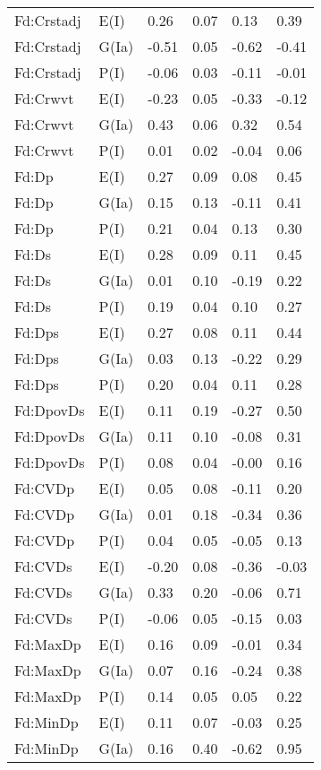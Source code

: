 \begin{center}
\begin{longtable}{|p{1.1in}|p{0.7in}|p{0.7in}|p{0.6in}|p{0.6in}|p{0.6in}|}
  Fd:Crstadj & E(I) & 0.26 & 0.07 & 0.13 & 0.39 \\ 
  Fd:Crstadj & G(Ia) & -0.51 & 0.05 & -0.62 & -0.41 \\ 
  Fd:Crstadj & P(I) & -0.06 & 0.03 & -0.11 & -0.01 \\ 
  Fd:Crwvt & E(I) & -0.23 & 0.05 & -0.33 & -0.12 \\ 
  Fd:Crwvt & G(Ia) & 0.43 & 0.06 & 0.32 & 0.54 \\ 
  Fd:Crwvt & P(I) & 0.01 & 0.02 & -0.04 & 0.06 \\ 
  Fd:Dp & E(I) & 0.27 & 0.09 & 0.08 & 0.45 \\ 
  Fd:Dp & G(Ia) & 0.15 & 0.13 & -0.11 & 0.41 \\ 
  Fd:Dp & P(I) & 0.21 & 0.04 & 0.13 & 0.30 \\ 
  Fd:Ds & E(I) & 0.28 & 0.09 & 0.11 & 0.45 \\ 
  Fd:Ds & G(Ia) & 0.01 & 0.10 & -0.19 & 0.22 \\ 
  Fd:Ds & P(I) & 0.19 & 0.04 & 0.10 & 0.27 \\ 
  Fd:Dps & E(I) & 0.27 & 0.08 & 0.11 & 0.44 \\ 
  Fd:Dps & G(Ia) & 0.03 & 0.13 & -0.22 & 0.29 \\ 
  Fd:Dps & P(I) & 0.20 & 0.04 & 0.11 & 0.28 \\ 
  Fd:DpovDs & E(I) & 0.11 & 0.19 & -0.27 & 0.50 \\ 
  Fd:DpovDs & G(Ia) & 0.11 & 0.10 & -0.08 & 0.31 \\ 
  Fd:DpovDs & P(I) & 0.08 & 0.04 & -0.00 & 0.16 \\ 
  Fd:CVDp & E(I) & 0.05 & 0.08 & -0.11 & 0.20 \\ 
  Fd:CVDp & G(Ia) & 0.01 & 0.18 & -0.34 & 0.36 \\ 
  Fd:CVDp & P(I) & 0.04 & 0.05 & -0.05 & 0.13 \\ 
  Fd:CVDs & E(I) & -0.20 & 0.08 & -0.36 & -0.03 \\ 
  Fd:CVDs & G(Ia) & 0.33 & 0.20 & -0.06 & 0.71 \\ 
  Fd:CVDs & P(I) & -0.06 & 0.05 & -0.15 & 0.03 \\ 
  Fd:MaxDp & E(I) & 0.16 & 0.09 & -0.01 & 0.34 \\ 
  Fd:MaxDp & G(Ia) & 0.07 & 0.16 & -0.24 & 0.38 \\ 
  Fd:MaxDp & P(I) & 0.14 & 0.05 & 0.05 & 0.22 \\ 
  Fd:MinDp & E(I) & 0.11 & 0.07 & -0.03 & 0.25 \\ 
  Fd:MinDp & G(Ia) & 0.16 & 0.40 & -0.62 & 0.95 \\ 

\end{longtable}
\end{center}
